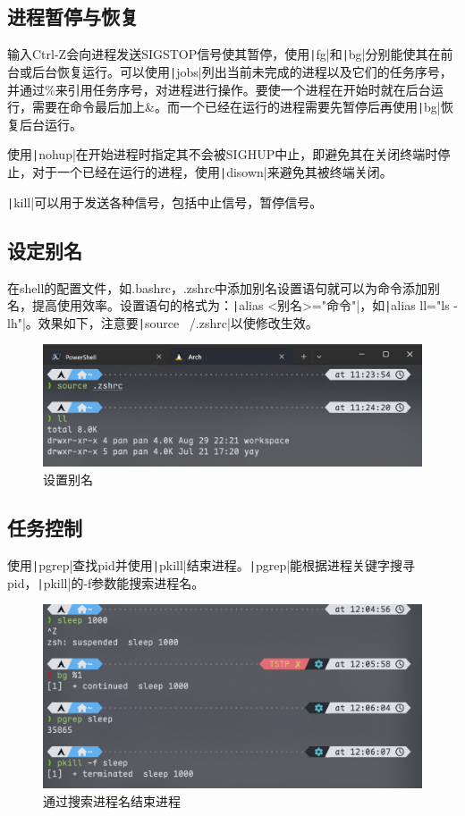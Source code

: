 \documentclass[fontset=ubuntu]{ctexart}
\begin{document}
\subsection{进程暂停与恢复}
输入Ctrl-Z会向进程发送SIGSTOP信号使其暂停，使用\texttt|fg|和\texttt|bg|分别能使其在前台或后台恢复运行。可以使用\texttt|jobs|列出当前未完成的进程以及它们的任务序号，并通过\%来引用任务序号，对进程进行操作。要使一个进程在开始时就在后台运行，需要在命令最后加上\&。而一个已经在运行的进程需要先暂停后再使用\texttt|bg|恢复后台运行。

使用\texttt|nohup|在开始进程时指定其不会被SIGHUP中止，即避免其在关闭终端时停止，对于一个已经在运行的进程，使用\texttt|disown|来避免其被终端关闭。

\texttt|kill|可以用于发送各种信号，包括中止信号，暂停信号。

\subsection{设定别名}
在shell的配置文件，如.bashrc，.zshrc中添加别名设置语句就可以为命令添加别名，提高使用效率。设置语句的格式为：\texttt|alias <别名>="命令"|，如\texttt|alias ll="ls -lh"|。效果如下，注意要\texttt|source ~/.zshrc|以使修改生效。
\begin{figure}[htb]
    \centering
    \includegraphics[width=0.75\linewidth]{alias_1.png}
    \caption{设置别名}
    \label{fig:alias_1}
\end{figure}

\subsection{任务控制}
使用\texttt|pgrep|查找pid并使用\texttt|pkill|结束进程。\texttt|pgrep|能根据进程关键字搜寻pid，\texttt|pkill|的-f参数能搜索进程名。
\begin{figure}[htb]
    \centering
    \includegraphics[width=0.75\linewidth]{pkill_1.png}
    \caption{通过搜索进程名结束进程}
    \label{fig:pkill_1}
\end{figure}
\end{document}
